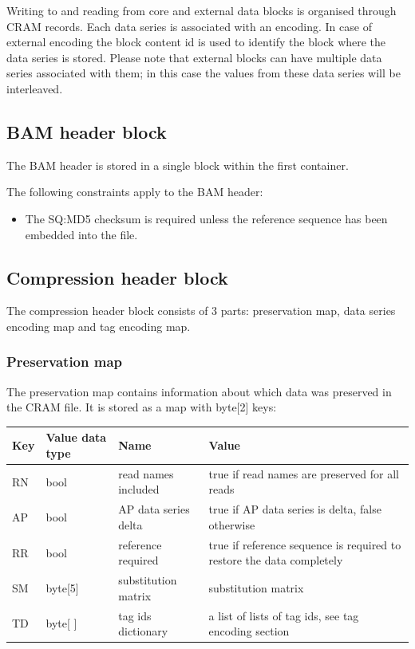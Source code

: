 \documentclass[a4paper]{article}
\begin{document}
Writing to and reading from core and external data blocks is organised through 
CRAM records. Each data series is associated with an encoding. In case of external 
encoding the block content id is used to identify the block where the data series 
is stored. Please note that external blocks can have multiple data series associated 
with them; in this case the values from these data series will be interleaved. 


\subsection{\textbf{BAM header block}}

The BAM header is stored in a single block within the first container. 

The following constraints apply to the BAM header: 

\begin{itemize}
\item The SQ:MD5 checksum is required unless the reference sequence has been embedded 
into the file.
\end{itemize}

\subsection{\textbf{Compression header block}}
\label{subsec:compression-header}

The compression header block consists of 3 parts: preservation map, data series 
encoding map and tag encoding map.

\subsubsection*{Preservation map}

The preservation map contains information about which data was preserved in the 
CRAM file. It is stored as a map with byte[2] keys:

\begin{tabular}{|l|l|>{\raggedright}p{100pt}|>{\raggedright}p{220pt}|}
\hline
\textbf{Key} & \textbf{Value data type} & \textbf{Name} & \textbf{Value}\tabularnewline
\hline
RN & bool & read names included & true if read names are preserved for all reads\tabularnewline
\hline
AP & bool & AP data series delta & true if AP data series is delta, false otherwise\tabularnewline
\hline
RR & bool & reference required & true if reference sequence is required to restore 
the data completely\tabularnewline
\hline
SM & byte[5] & substitution matrix & substitution matrix\tabularnewline
\hline
TD & byte[ ] & tag ids dictionary & a list of lists of tag ids, see tag encoding 
section\tabularnewline
\hline
\end{tabular}
\end{document}
